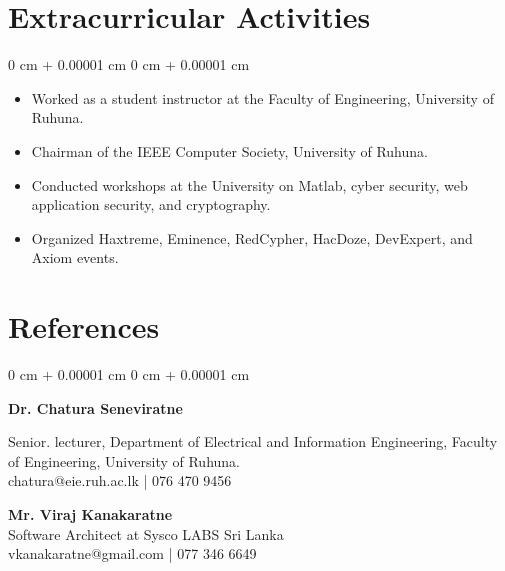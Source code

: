 \documentclass[10pt, letterpaper]{article}
\newenvironment{highlights}{
    \begin{itemize}[
        topsep=0.10 cm,
        parsep=0.10 cm,
        partopsep=0pt,
        itemsep=0pt,
        leftmargin=0 cm + 10pt
    ]
}{
    \end{itemize}
} %
\newenvironment{onecolentry}{
    \begin{adjustwidth}{
        0 cm + 0.00001 cm
    }{
        0 cm + 0.00001 cm
    }
}{
    \end{adjustwidth}
} %
\begin{document}
    \section{Extracurricular Activities}
        \begin{onecolentry}
            \begin{highlights}
                \item Worked as a student instructor at the Faculty of Engineering, University of Ruhuna.
                \item Chairman of the IEEE Computer Society, University of Ruhuna.
                \item Conducted workshops at the University on Matlab, cyber security, web application security, and cryptography.
                \item Organized Haxtreme, Eminence, RedCypher, HacDoze, DevExpert, and Axiom events.
            \end{highlights}
        \end{onecolentry}




    \section{References}
        \begin{onecolentry}

            \textbf{Dr. Chatura Seneviratne}
            \\
            \vspace{0.10 cm}

            Senior. lecturer, Department of Electrical and Information Engineering, Faculty of Engineering, University of Ruhuna. \\
            chatura@eie.ruh.ac.lk | 076 470 9456


            \vspace{0.30 cm}
            
            \textbf{Mr. Viraj Kanakaratne}
            \vspace{0.10 cm}
            \\
            Software Architect at Sysco LABS Sri Lanka
            \\vkanakaratne@gmail.com | 077 346 6649


            




        \end{onecolentry}
\end{document}

